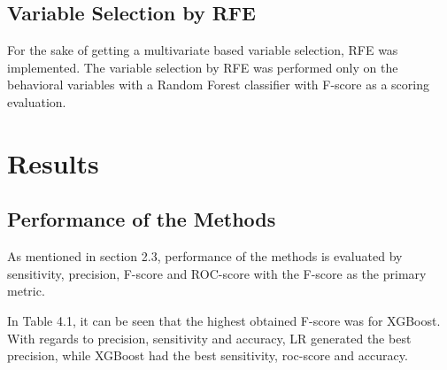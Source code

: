 \documentclass[a4paper]{article}
\begin{document}
\subsection{Variable Selection by RFE}
For the sake of getting a multivariate based variable selection, RFE was implemented. The variable selection by RFE was performed only on the behavioral variables with a Random Forest classifier with F-score as a scoring evaluation.


\section{Results}

\subsection{Performance of the Methods}
As mentioned in section 2.3, performance of the methods is evaluated by sensitivity, precision, F-score and ROC-score with the F-score as the primary metric. 

In Table 4.1, it can be seen that the highest obtained F-score was for XGBoost. With regards to precision, sensitivity and accuracy, LR generated the best precision, while XGBoost had the best sensitivity, roc-score and accuracy.

\vspace{0.3cm}

\begin{center}
 \label{tab:title} 
\end{center}
\end{document}
